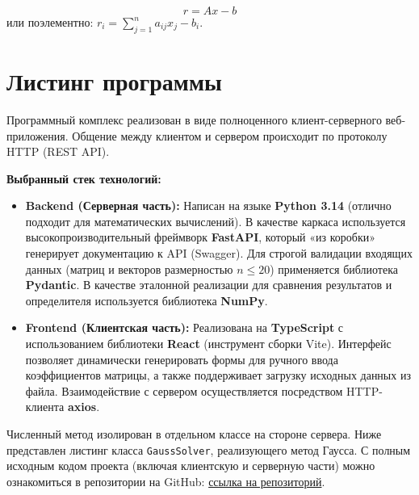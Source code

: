 \documentclass[a4paper,12pt]{article}
\begin{document}
\begin{equation}
    r = Ax - b
\end{equation}
или поэлементно: $r_i = \sum_{j=1}^n a_{ij}x_j - b_i$.

\newpage
\section{Листинг программы}

Программный комплекс реализован в виде полноценного клиент-серверного веб-приложения. Общение между клиентом и сервером происходит по протоколу HTTP (REST API).

\textbf{Выбранный стек технологий:}
\begin{itemize}
    \item \textbf{Backend (Серверная часть):} Написан на языке \textbf{Python 3.14} (отлично подходит для математических вычислений). В качестве каркаса используется высокопроизводительный фреймворк \textbf{FastAPI}, который «из коробки» генерирует документацию к API (Swagger). Для строгой валидации входящих данных (матриц и векторов размерностью $n \le 20$) применяется библиотека \textbf{Pydantic}. В качестве эталонной реализации для сравнения результатов и определителя используется библиотека \textbf{NumPy}.
    \item \textbf{Frontend (Клиентская часть):} Реализована на \textbf{TypeScript} с использованием библиотеки \textbf{React} (инструмент сборки Vite). Интерфейс позволяет динамически генерировать формы для ручного ввода коэффициентов матрицы, а также поддерживает загрузку исходных данных из файла. Взаимодействие с сервером осуществляется посредством HTTP-клиента \textbf{axios}.
\end{itemize}

Численный метод изолирован в отдельном классе на стороне сервера. Ниже представлен листинг класса \texttt{GaussSolver}, реализующего метод Гаусса. С полным исходным кодом проекта (включая клиентскую и серверную части) можно ознакомиться в репозитории на GitHub: \href{https://github.com/Axe-On-You/Comp-math/tree/main/labwork1}{ссылка на репозиторий}.

\newpage
\end{document}
